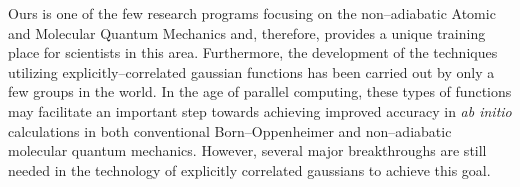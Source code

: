 Ours is one of the few research 
programs focusing on the non--adiabatic 
Atomic and Molecular Quantum Mechanics
and, therefore, provides a unique 
training place for scientists in this area.  
Furthermore, the development of the techniques 
utilizing explicitly--correlated gaussian functions
has been carried out by only a few groups in the world.  
In the age of parallel computing, these
types of functions may facilitate an important 
step towards achieving improved accuracy in 
{\it ab initio} calculations in both conventional 
Born--Oppenheimer and non--adiabatic 
molecular quantum mechanics.
However, several major breakthroughs are still needed 
in the technology of explicitly correlated gaussians
to achieve this goal.


\pagebreak


